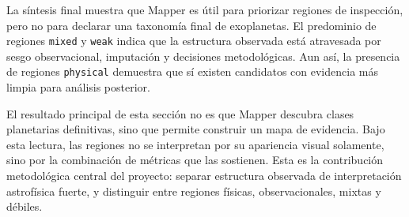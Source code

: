 La síntesis final muestra que Mapper es útil para priorizar regiones de inspección, pero no para declarar una taxonomía final de exoplanetas. El predominio de regiones \texttt{mixed} y \texttt{weak} indica que la estructura observada está atravesada por sesgo observacional, imputación y decisiones metodológicas. Aun así, la presencia de regiones \texttt{physical} demuestra que sí existen candidatos con evidencia más limpia para análisis posterior.

El resultado principal de esta sección no es que Mapper descubra clases planetarias definitivas, sino que permite construir un mapa de evidencia. Bajo esta lectura, las regiones no se interpretan por su apariencia visual solamente, sino por la combinación de métricas que las sostienen. Esta es la contribución metodológica central del proyecto: separar estructura observada de interpretación astrofísica fuerte, y distinguir entre regiones físicas, observacionales, mixtas y débiles.